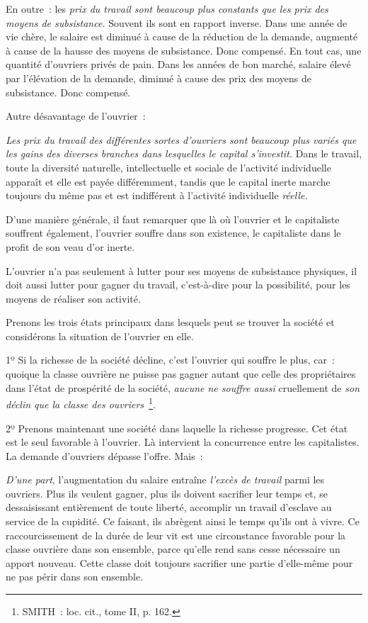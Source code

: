 \documentclass[french,twoside]{book} %
\begin{document}
En outre : les \emph{prix du travail sont beaucoup plus constants que les prix des moyens de subsistance.} Souvent ils sont en rapport inverse. Dans une année de vie chère, le salaire est diminué à cause de la réduction de la demande, augmenté à cause de la hausse des moyens de subsistance. Donc compensé. En tout cas, une quantité d’ouvriers privés de pain. Dans les années de bon marché, salaire élevé par l’élévation de la demande, diminué à cause des prix des moyens de subsistance. Donc compensé.\par
Autre désavantage de l’ouvrier :\par
\emph{Les prix du travail des différentes sortes d’ouvriers sont beaucoup plus variés que les gains des diverses branches dans lesquelles le capital s’investit.} Dans le travail, toute la diversité naturelle, intellectuelle et sociale de l’activité individuelle apparaît et elle est payée différemment, tandis que le capital inerte marche toujours du même pas et est indifférent à l’activité individuelle \emph{réelle.}\par
D’une manière générale, il faut remarquer que là où l’ouvrier et le capitaliste souffrent également, l’ouvrier souffre dans son existence, le capitaliste dans le profit de son veau d’or inerte.\par
L’ouvrier n’a pas seulement à lutter pour ses moyens de subsistance physiques, il doit aussi lutter pour gagner du travail, c’est-à-dire pour la possibilité, pour les moyens de réaliser son activité.\par
Prenons les trois états principaux dans lesquels peut se trouver la société et considérons la situation de l’ouvrier en elle.\par
1º Si la richesse de la société décline, c’est l’ouvrier qui souffre le plus, car : quoique la classe ouvrière ne puisse pas gagner autant que celle des propriétaires dans l’état de prospérité de la société, \emph{aucune ne souffre aussi} cruellement de \emph{son déclin que la classe des ouvriers} \footnote{SMITH : loc. cit., tome II, p. 162.}.\par
[III] 2º Prenons maintenant une société dans laquelle la richesse progresse. Cet état est le seul favorable à l’ouvrier. Là intervient la concurrence entre les capitalistes. La demande d’ouvriers dépasse l’offre. Mais :\par
\emph{D’une part}, l’augmentation du salaire entraîne \emph{l’excès de travail} parmi les ouvriers. Plus ils veulent gagner, plus ils doivent sacrifier leur temps et, se dessaisissant entièrement de toute liberté, accomplir un travail d’esclave au service de la cupidité. Ce faisant, ils abrègent ainsi le temps qu’ils ont à vivre. Ce raccourcissement de la durée de leur vit est une circonstance favorable pour la classe ouvrière dans son ensemble, parce qu’elle rend sans cesse nécessaire un apport nouveau. Cette classe doit toujours sacrifier une partie d’elle-même pour ne pas périr dans son ensemble.\par
\end{document}
